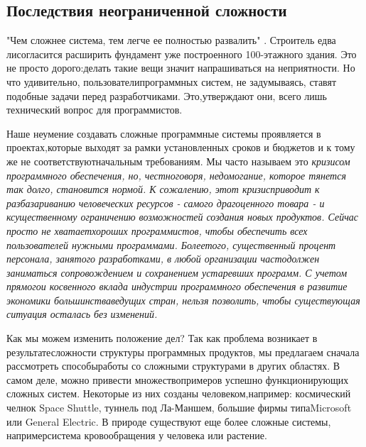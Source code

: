 \documentclass[11pt]{article}
\begin{document}
\subsection{Последствия неограниченной сложности}
"Чем сложнее система, тем легче ее полностью развалить" \cite{n5}. Строитель едва ли\linebreak согласится расширить фундамент уже построенного 100-этажного здания. Это не просто дорого:\linebreak делать такие вещи значит напрашиваться на неприятности. Но что удивительно, пользователи\linebreak программных систем, не задумываясь, ставят подобные задачи перед разработчиками. Это,\linebreak утверждают они, всего лишь технический вопрос для программистов. \bigskip

Наше неумение создавать сложные программные системы проявляется в проектах,\linebreak которые выходят за рамки установленных сроков и бюджетов и к тому же не соответствуют\linebreak начальным требованиям. Мы часто называем это \it кризисом программного обеспечения, \rm но, честно\linebreak говоря, недомогание, которое тянется так долго, становится нормой. К сожалению, этот кризис\linebreak приводит к разбазариванию человеческих ресурсов - самого драгоценного товара - и к\linebreak существенному ограничению возможностей создания новых продуктов. Сейчас просто не хватает\linebreak хороших программистов, чтобы обеспечить всех пользователей нужными программами. Более\linebreak того, существенный процент персонала, занятого разработками, в любой организации часто\linebreak должен заниматься сопровождением и сохранением устаревших программ. С учетом прямого\linebreak и косвенного вклада индустрии программного обеспечения в развитие экономики большинства\linebreak ведущих стран, нельзя позволить, чтобы существующая ситуация осталась без изменений.\bigskip 

Как мы можем изменить положение дел? Так как проблема возникает в результате\linebreak сложности структуры программных продуктов, мы предлагаем сначала рассмотреть способы\linebreak работы со сложными структурами в других областях. В самом деле, можно привести множество\linebreak примеров успешно функционирующих сложных систем. Некоторые из них созданы человеком,\linebreak например: космический челнок Space Shuttle, туннель под Ла-Маншем, большие фирмы типа\linebreak Microsoft или General Electric. В природе существуют еще более сложные системы, например\linebreak система кровообращения у человека или растение. 
\end{document}
